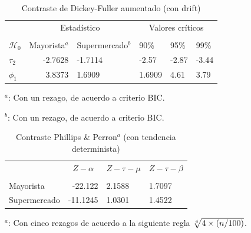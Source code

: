 \documentclass[12pt, twoside]{book}\usepackage[]{graphicx}\usepackage[]{color}
\numberwithin{equation}{section}
\numberwithin{theorem}{section}
\numberwithin{teorema}{section}
\numberwithin{defi}{section}
\numberwithin{prop}{section}
\numberwithin{defi}{section}
\theoremstyle{plain}
\begin{document}
\begin{table}[H]
\centering
\begin{threeparttable}
\caption{Contraste de Dickey-Fuller aumentado (con drift)}
\begin{tabular}{@{}lrllll@{}}
\toprule
\multicolumn{1}{l}{} & \multicolumn{2}{c}{Estadístico} &
\multicolumn{3}{c}{Valores críticos} \\
\cmidrule(l){2-3} \cmidrule(l){4-6} \\
\multicolumn{1}{l}{$\mathcal{H}_0$} & \multicolumn{1}{c}{Mayorista$^{a}$} &
 \multicolumn{1}{c}{Supermercado$^{b}$} &
\multicolumn{1}{l}{90\%}&
\multicolumn{1}{l}{95\%}&
\multicolumn{1}{l}{99\%}
\\
\midrule
$\tau_{2} $  & -2.7628 &  -1.7114 & -2.57 & -2.87 & -3.44 \\
$\phi_{1} $  & 3.8373  &  1.6909 & 1.6909 & 4.61 & 3.79 \\
\bottomrule
\end{tabular}
\label{tab-3}
\begin{tablenotes}
\small 
\item $^{a}$: Con un rezago, de acuerdo a criterio BIC. 
\item $^{b}$: Con un rezago, de acuerdo a criterio BIC. 
\end{tablenotes}
\end{threeparttable}
\end{table}



\begin{table}[H]
\centering
\begin{threeparttable}
\caption{Contraste Phillips \& Perron$^{a}$ (con tendencia determinista)}
\begin{tabular}{@{}lrll@{}}
\toprule

 & \multicolumn{1}{c}{$Z-\alpha$} &
\multicolumn{1}{l}{$Z-\tau-\mu$}&
\multicolumn{1}{l}{$Z-\tau-\beta$}
\\
\cmidrule(l){2-2} \cmidrule(l){3-4} \\
Mayorista  & -22.122 &  2.1588 & 1.7097\\
Supermercado & -11.1245 & 1.0301 & 1.4522 \\
\bottomrule
\end{tabular}
\label{tab-4}
\begin{tablenotes}
\small 
\item $^{a}$: Con cinco rezagos de acuerdo a la siguiente regla $\root 4 \of {4 \times (n/100)}$. 
\end{tablenotes}
\end{threeparttable}
\end{table}
\end{document}
